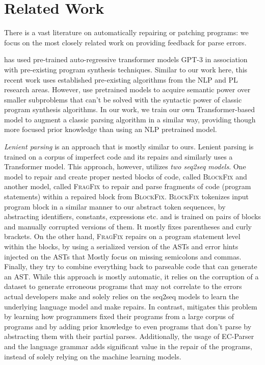 \section{Related Work}
\label{sec:related-work}

There is a vast literature on automatically repairing or patching programs:
we focus on the most closely related work on providing feedback for parse
errors.


%
\citep{Rahmani2021, Verbruggen2021} has used pre-trained auto-regressive
transformer models \ie \textsc{GPT-3} \citep{GPT2020} in association with
pre-existing program synthesis techniques. Similar to our work here, this recent
work uses established pre-existing algorithms from the NLP and PL research
areas. However, \citep{Rahmani2021, Verbruggen2021} use pretrained models to
acquire semantic power over smaller subproblems that can't be solved with the
syntactic power of classic program synthesis algorithms. In our work, we train
our own Transformer-based model to augment a classic parsing algorithm in a
similar way, providing though more focused prior knowledge than using an NLP
pretrained model.

\emph{Lenient parsing} \citep{Ahmed_2021} is an approach that is mostly similar
to ours. Lenient parsing is trained on a corpus of imperfect code and its
repairs and similarly uses a Transformer model. This approach, however, utilizes
\emph{two seq2seq models}. One model to repair and create proper nested blocks
of code, called \textsc{BlockFix} and another model, called \textsc{FragFix} to
repair and parse fragments of code (\eg program statements) within a repaired
block from \textsc{BlockFix}. \textsc{BlockFix} tokenizes input program block in
a similar manner to our abstract token sequences, by abstracting identifiers,
constants, expressions etc. and is trained on pairs of blocks and manually
corrupted versions of them. It mostly fixes parentheses and curly brackets. On
the other hand, \textsc{FragFix} repairs on a program statement level within the
blocks, by using a serialized version of the ASTs and error hints injected on
the ASTs that Mostly focus on missing semicolons and commas. Finally, they try
to combine everything back to parseable code that can generate an AST. While
this approach is mostly automatic, it relies on the corruption of a dataset to
generate erroneous programs that may not correlate to the errors actual
developers make and solely relies on the seq2seq models to learn the underlying
language model and make repairs. In contrast, \toolname mitigates this problem
by learning how programmers fixed their programs from a large corpus of programs
and by adding prior knowledge to even programs that don't parse by abstracting
them with their partial parses. Additionally, the usage of EC-Parser and the
language grammar adds significant value in the repair of the programs, instead
of solely relying on the machine learning models.

